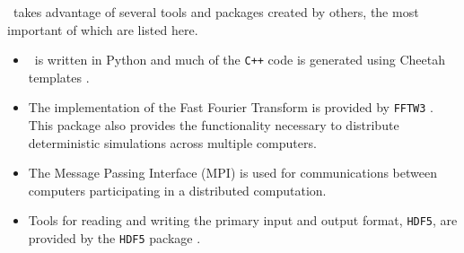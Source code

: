 \xpdeint\ takes advantage of several tools and packages created by others, the most important of which are listed here.
\begin{itemize}
    \item \xpdeint\ is written in Python \citep{Python} and much of the \texttt{C++} code is generated using Cheetah templates \citep{CheetahTemplates}.
    \item The implementation of the Fast Fourier Transform is provided by \texttt{FFTW3} \citep{FFTW3}.  This package also provides the functionality necessary to distribute deterministic simulations across multiple computers.
    \item The Message Passing Interface (MPI) \citep{MPI} is used for communications between computers participating in a distributed computation.
    \item Tools for reading and writing the primary input and output format, \texttt{HDF5}, are provided by the \texttt{HDF5} package \citep{HDF5}.
\end{itemize}




